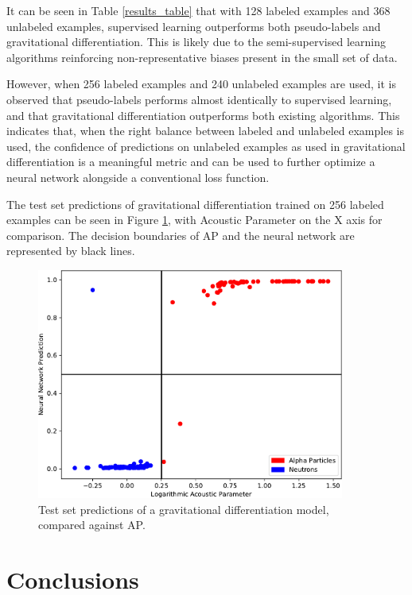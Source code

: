 \documentclass[10pt]{article}
\begin{document}
It can be seen in Table \ref{results_table} that with 128 labeled examples and 368 unlabeled examples, supervised learning outperforms both pseudo-labels and gravitational differentiation. This is likely due to the semi-supervised learning algorithms reinforcing non-representative biases present in the small set of data.

However, when 256 labeled examples and 240 unlabeled examples are used, it is observed that pseudo-labels performs almost identically to supervised learning, and that gravitational differentiation outperforms both existing algorithms. This indicates that, when the right balance between labeled and unlabeled examples is used, the confidence of predictions on unlabeled examples as used in gravitational differentiation is a meaningful metric and can be used to further optimize a neural network alongside a conventional loss function.

The test set predictions of gravitational differentiation trained on 256 labeled examples can be seen in Figure \ref{grav_test_hist}, with Acoustic Parameter on the X axis for comparison. The decision boundaries of AP and the neural network are represented by black lines.

\begin{figure}[H]
    \centering
    \includegraphics[width=0.9\textwidth]{grav_test_hist}
    \caption{\label{grav_test_hist} Test set predictions of a gravitational differentiation model, compared against AP.}
\end{figure}

\section{Conclusions} \label{conclusions}
\end{document}
